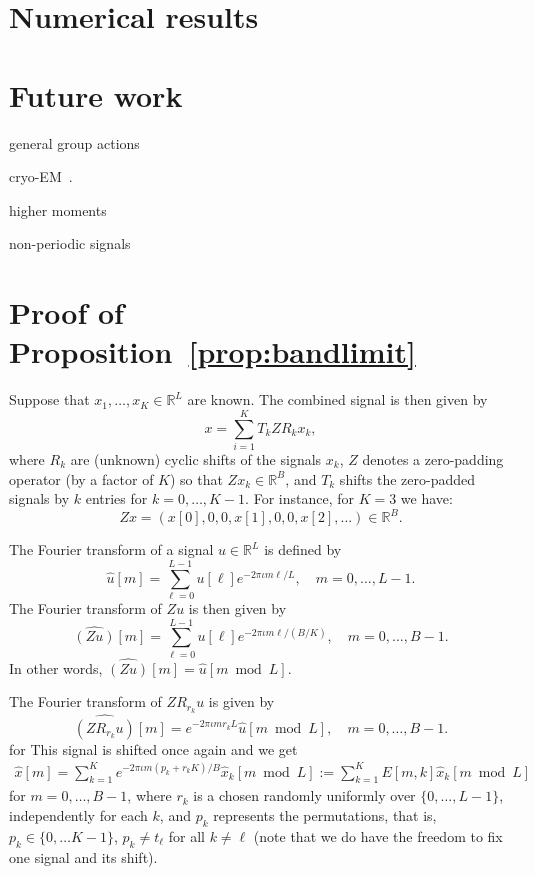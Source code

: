 \documentclass[english,12pt]{article}
\newcommand{\I}{\iota}
\newcommand{\R}{\mathbb{R}}
\numberwithin{equation}{section}
\numberwithin{mytheorem}{section} %
\begin{document}
\section{Numerical results}


\section{Future work}
general group actions

cryo-EM~\cite{chen2018single}.

higher moments

non-periodic signals 

	
	




\appendix

\section{Proof of Proposition~\ref{prop:bandlimit}}
Suppose that $x_1,\ldots,x_K\in\R^L$ are known.
The combined signal is then given by 
\begin{equation}
x = \sum_{i=1}^K T_kZR_kx_k,
\end{equation}
where $R_k$ are (unknown) cyclic shifts of the signals $x_k$, $Z$ denotes a zero-padding operator (by a factor of $K$) so that $Zx_k\in\mathbb{R}^B$, and $T_k$ shifts the zero-padded signals by $k$ entries for $k=0,\ldots, K-1$. 
For instance, for $K=3$ we have: 
\begin{equation}
Zx = (x[0],0,0,x[1],0,0,x[2],...)\in\mathbb{R}^B.
\end{equation}

The Fourier transform of a signal $u\in\mathbb{R}^{L}$ is defined by 
\begin{equation}
\hat{u}[m]=\sum_{\ell=0}^{L-1}u[\ell]e^{-2\pi\I m\ell /L}, \quad m=0,\ldots,L-1. 
\end{equation}
The Fourier transform of $Zu$ is then given by 
\begin{equation}
\widehat{(Zu)}[m] = \sum_{\ell=0}^{L-1}u[\ell]e^{-2\pi\I m\ell /(B/K)}, \quad m=0,\ldots,B-1.
\end{equation}
In other words, $\widehat{(Zu)}[m] = \hat{u}[m\bmod L]$.


The Fourier transform of $ZR_{r_k}u$ is  given by 
\begin{equation}
\widehat{(ZR_{r_k}u)}[m] = e^{-2\pi\I m r_k L} \hat{u}[m\bmod L], \quad m=0,\ldots,B-1.
\end{equation}
for 
This signal is shifted once again and we get
\begin{eqnarray} \label{eq:Fourier_structure}
\hat{x}[m] = \sum_{k=1}^K e^{-2\pi\I m( p_k+r_k K)/B} \hat{x}_k[m \bmod L] := \sum_{k=1}^K E[m,k] \hat{x}_k[m \bmod L]
\end{eqnarray}
for $m=0,\ldots,B-1$, 
where $r_k$ is a chosen randomly uniformly over $\{0,\ldots,L-1\}$, independently for each $k$, and $p_k$ represents the permutations, that is, $p_k\in\{0,\ldots K-1\}$, $p_k\neq t_\ell$ for all $k\neq \ell$ (note that we do have the freedom to fix one signal and its shift). 
\end{document}

